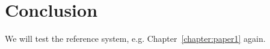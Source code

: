 \chapter{Conclusion}
\label{conclusion:conclusion}
We will test the reference system, e.g. Chapter~\ref{chapter:paper1} again.
